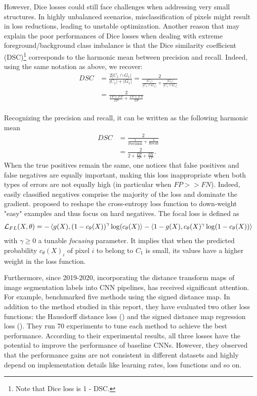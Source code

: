 \documentclass[onecolumn]{article}
\begin{document}
However, Dice losses could still face challenges when addressing very small structures. In highly unbalanced scenarios, misclassification of pixels might result in loss reductions, leading to unstable optimization. Another reason that may explain the poor performances of Dice losses when dealing with extreme foreground/background class imbalance is that the Dice similarity coefficient (DSC)\footnote{Note that Dice loss is 1 - DSC.} corresponds to the harmonic mean between precision and recall. Indeed, using the same notation as above, we recover:
\begin{align*}
    DSC &= \frac{2 |C_1 \cap G_1|}{|C_1| + |G_1|} = \frac{2}{\frac{|C_1|}{|C_1\cap G_1|} + \frac{|G_1|}{|C_1 \cap G_1|}}\\
    &= \frac{2}{\frac{TP + FP}{TP} + \frac{TP + FN}{TP}} \\
\end{align*}

Recognizing the precision and recall, it can be written as the following harmonic mean
\begin{align*}
    DSC &= \frac{2}{\frac{1}{\text{Precision}} + \frac{1}{\text{Recall}}} \\
    &= \frac{2}{2 + \frac{FP}{TP} + \frac{FN}{TP}}.
\end{align*}
When the true positives remain the same, one notices that false positives and false negatives are equally important, making this loss inappropriate when both types of errors are not equally high (in particular when $FP >> FN$). Indeed, easily classified negatives comprise the majority of the loss and dominate the gradient. \cite{lin_focal_2018} proposed to reshape the cross-entropy loss function to down-weight "easy" examples and thus focus on hard negatives. The focal loss is defined as 
\begin{equation}
    \mathcal{L}_{FL}(X, \theta) = -\left \langle g(X), \left ( 1 - c_\theta(X) \right )^\gamma \log(c_\theta(X) \right \rangle - \left \langle 1-g(X), c_\theta(X)^\gamma \log(1-c_\theta(X)) \right \rangle
\end{equation}
with $\gamma \geq 0$ a tunable \textit{focusing} parameter.
It implies that when the predicted probability $c_\theta(X)_i$ of pixel $i$ to belong to $C_1$ is small, its values have a higher weight in the loss function. 

Furthermore, since 2019-2020, incorporating the distance transform maps of image segmentation labels into CNN pipelines, has received significant attention. For example, \cite{ma_how_2020} benchmarked five methods using the signed distance map. In addition to the method studied in this report, they have evaluated two other loss functions: the Hausdorff distance loss (\cite{karimi_reducing_2019}) and the signed distance map regression loss (\cite{xue_shape-aware_2019}). They run 70 experiments to tune each method to achieve the best performance. According to their experimental results, all three losses have the potential to improve the performance of baseline CNNs. However, they observed that the performance gains are not consistent in different datasets and highly depend on implementation details like learning rates, loss functions and so on. 
\end{document}
